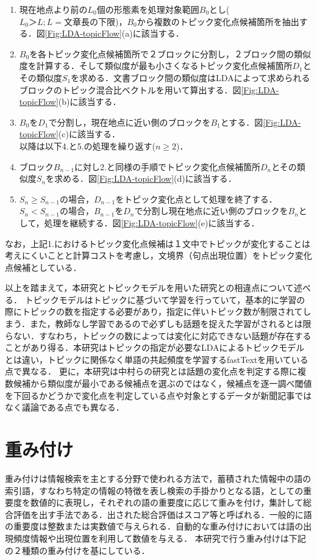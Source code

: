 \begin{enumerate}
  \item 現在地点より前の$L_0$個の形態素を処理対象範囲$B_0$とし($L_0＞L;L=文章長の下限$)，$B_0$から複数のトピック変化点候補箇所を抽出する．図\ref{Fig:LDA-topicFlow}(a)に該当する．
  \item $B_0$を各トピック変化点候補箇所で２ブロックに分割し，２ブロック間の類似度を計算する．そして類似度が最も小さくなるトピック変化点候補箇所$D_1$とその類似度$S_1$を求める．文書ブロック間の類似度はLDAによって求められるブロックのトピック混合比ベクトルを用いて算出する．図\ref{Fig:LDA-topicFlow}(b)に該当する．
  \item $B_0$を$D_1$で分割し，現在地点に近い側のブロックを$B_1$とする．図\ref{Fig:LDA-topicFlow}(c)に該当する．
  \\
  以降は以下4.と5.の処理を繰り返す($n\geq2$)．
  \item ブロック$B_{n-1}$に対し2.と同様の手順でトピック変化点候補箇所$D_n$とその類似度$S_n$を求める．図\ref{Fig:LDA-topicFlow}(d)に該当する．
  \item $S_n \geq S_{n-1}$の場合，$D_{n-1}$をトピック変化点として処理を終了する．$S_n <  S_{n-1}$の場合，$B_{n-1}$を$D_n$で分割し現在地点に近い側のブロックを$B_n$として，処理を継続する．図\ref{Fig:LDA-topicFlow}(e)に該当する．
\end{enumerate}
なお，上記1.におけるトピック変化点候補は１文中でトピックが変化することは考えにくいことと計算コストを考慮し，文境界（句点出現位置）をトピック変化点候補としている．

以上を踏まえて，本研究とトピックモデルを用いた研究との相違点について述べる．
トピックモデルはトピックに基づいて学習を行っていて，基本的に学習の際にトピックの数を指定する必要があり，指定に伴いトピック数が制限されてしまう．また，教師なし学習であるので必ずしも話題を捉えた学習がされるとは限らない．すなわち，トピックの数によっては変化に対応できない話題が存在することがあり得る．本研究はトピックの指定が必要なLDAによるトピックモデルとは違い，トピックに関係なく単語の共起頻度を学習するfastTextを用いている点で異なる．
更に，本研究は中村らの研究とは話題の変化点を判定する際に複数候補から類似度が最小である候補点を選ぶのではなく，候補点を逐一調べ閾値を下回るかどうかで変化点を判定している点や対象とするデータが新聞記事ではなく議論である点でも異なる．
\section{重み付け}
\label{rel:part:weight}
重み付けは情報検索を主とする分野で使われる方法で，蓄積された情報中の語の索引語，すなわち特定の情報の特徴を表し検索の手掛かりとなる語，としての重要度を数値的に表現し，それぞれの語の重要度に応じて重みを付け，集計して総合評価を出す手法である．出された総合評価はスコア等と呼ばれる．一般的に語の重要度は整数または実数値で与えられる．自動的な重み付けにおいては語の出現頻度情報や出現位置を利用して数値を与える．
本研究で行う重み付けは下記の２種類の重み付けを基にしている．
